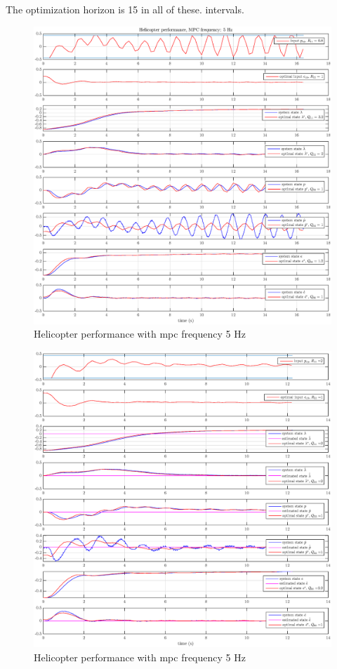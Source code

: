 The optimization horizon is 15 in all of these. 
 intervals. 

\begin{figure}
    \centering
    \includegraphics[scale=0.43]{fig/heli_sim_5_15_tune_2.eps}
    \caption{Helicopter performance with \acrshort{mpc} frequency 5 Hz}
    \label{fig:heli_sim_5_1}
\end{figure}


\begin{figure}
    \centering
    \includegraphics[scale=0.43]{fig/heli_sim_5_15.eps}
    \caption{Helicopter performance with \acrshort{mpc} frequency 5 Hz}
    \label{fig:heli_sim_5_2}
\end{figure}

